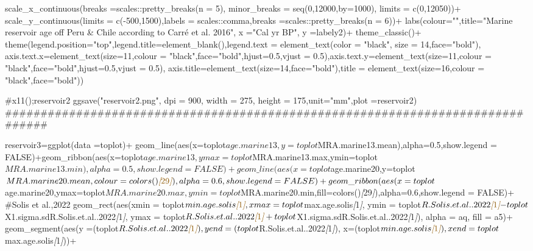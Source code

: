 \documentclass[
]{article}
\newenvironment{Shaded}{\begin{snugshade}}{\end{snugshade}}
\newcommand{\CommentTok}[1]{\textcolor[rgb]{0.56,0.35,0.01}{\textit{#1}}}
\newcommand{\NormalTok}[1]{#1}
\newcommand{\OtherTok}[1]{\textcolor[rgb]{0.56,0.35,0.01}{#1}}
\begin{document}
\begin{Shaded}
\begin{Highlighting}[]
\NormalTok{  scale\_x\_continuous(breaks =scales::pretty\_breaks(n = 5),}
\NormalTok{                     minor\_breaks = seq(0,12000,by=1000),}
\NormalTok{                     limits = c(0,12050))+}
\NormalTok{  scale\_y\_continuous(limits = c({-}500,1500),labels = scales::comma,breaks =scales::pretty\_breaks(n = 6))+}
\NormalTok{  labs(colour="",title="Marine reservoir age off Peru \& Chile according to Carré et al. 2016",}
\NormalTok{       x ="Cal yr BP", }
\NormalTok{       y =labely2)+}
\NormalTok{  theme\_classic()+}
\NormalTok{  theme(legend.position="top",legend.title=element\_blank(),legend.text = element\_text(color = "black", size = 14,face="bold"),}
\NormalTok{        axis.text.x=element\_text(size=11,colour = "black",face="bold",hjust=0.5,vjust = 0.5),axis.text.y=element\_text(size=11,colour = "black",face="bold",hjust=0.5,vjust = 0.5),}
\NormalTok{        axis.title=element\_text(size=14,face="bold"),title = element\_text(size=16,colour = "black",face="bold"))}

\NormalTok{\#x11();reservoir2}
\NormalTok{ggsave("reservoir2.png", dpi = 900,   width = 275,}
\NormalTok{       height = 175,unit="mm",plot =reservoir2)}
\NormalTok{\#\#\#\#\#\#\#\#\#\#\#\#\#\#\#\#\#\#\#\#\#\#\#\#\#\#\#\#\#\#\#\#\#\#\#\#\#\#\#\#\#\#\#\#\#\#\#\#\#\#\#\#\#\#\#\#\#\#\#\#\#\#\#\#\#\#\#\#\#\#\#\#\#\#\#\#\#\#\#  }
  
\NormalTok{reservoir3=ggplot(data =toplot)+}
\NormalTok{  geom\_line(aes(x=toplot$age.marine13,y=toplot$MRA.marine13.mean),alpha=0.5,show.legend = FALSE)+geom\_ribbon(aes(x=toplot$age.marine13,ymax=toplot$MRA.marine13.max,ymin=toplot$MRA.marine13.min),alpha=0.5,show.legend = FALSE)+}
\NormalTok{  geom\_line(aes(x=toplot$age.marine20,y=toplot$MRA.marine20.mean,colour=colors()}\CommentTok{[}\OtherTok{29}\CommentTok{]}\NormalTok{),alpha=0.6,show.legend = FALSE)+geom\_ribbon(aes(x=toplot$age.marine20,ymax=toplot$MRA.marine20.max,ymin=toplot$MRA.marine20.min,fill=colors()}\CommentTok{[}\OtherTok{29}\CommentTok{]}\NormalTok{),alpha=0.6,show.legend = FALSE)+  }
\NormalTok{  \#Solis et al.,2022}
\NormalTok{  geom\_rect(aes(xmin = toplot$min.age.solis}\CommentTok{[}\OtherTok{1}\CommentTok{]}\NormalTok{, }
\NormalTok{                xmax = toplot$max.age.solis}\CommentTok{[}\OtherTok{1}\CommentTok{]}\NormalTok{, }
\NormalTok{                ymin = toplot$R.Solis.et.al..2022}\CommentTok{[}\OtherTok{1}\CommentTok{]}\NormalTok{{-}toplot$X1.sigma.sdR.Solis.et.al..2022}\CommentTok{[}\OtherTok{1}\CommentTok{]}\NormalTok{,}
\NormalTok{                ymax = toplot$R.Solis.et.al..2022}\CommentTok{[}\OtherTok{1}\CommentTok{]}\NormalTok{+toplot$X1.sigma.sdR.Solis.et.al..2022}\CommentTok{[}\OtherTok{1}\CommentTok{]}\NormalTok{),}
\NormalTok{            alpha = aq,}
\NormalTok{            fill = a5)+}
\NormalTok{  geom\_segment(aes(y =(toplot$R.Solis.et.al..2022}\CommentTok{[}\OtherTok{1}\CommentTok{]}\NormalTok{),}
\NormalTok{                   yend =(toplot$R.Solis.et.al..2022}\CommentTok{[}\OtherTok{1}\CommentTok{]}\NormalTok{),}
\NormalTok{                   x=(toplot$min.age.solis}\CommentTok{[}\OtherTok{1}\CommentTok{]}\NormalTok{),}
\NormalTok{                   xend=toplot$max.age.solis}\CommentTok{[}\OtherTok{1}\CommentTok{]}\NormalTok{))+}
  

\end{Highlighting}
\end{Shaded}
\end{document}
